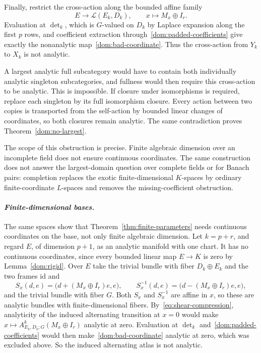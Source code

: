 \documentclass[11pt]{amsart}
\theoremstyle{definition}
\theoremstyle{remark}
\numberwithin{equation}{section}
\newcommand{\cL}{\mathcal L}
\newcommand{\id}{\mathrm{id}}
\begin{document}
Finally, restrict the cross-action along the bounded affine family
\[
E\longrightarrow\cL(E_k,D_k),\qquad x\longmapsto M_x\oplus I_r.
\]
Evaluation at $\det_k$, which is $G$\nobreakdash-valued on $D_k$ by Laplace expansion along the first $p$ rows, and coefficient extraction through~\eqref{dom:padded-coefficients} give exactly
the nonanalytic map~\eqref{dom:bad-coordinate}. Thus the cross-action from $Y_k$ to $X_k$ is not analytic.

A largest analytic full subcategory would have to contain both individually analytic singleton
subcategories, and fullness would then require this cross-action to be analytic. This is impossible.
If closure under isomorphisms is required, replace each singleton by its full isomorphism closure.
Every action between two copies is transported from the self-action by bounded linear changes of
coordinates, so both closures remain analytic. The same contradiction proves Theorem~\ref{dom:no-largest}.


The scope of this obstruction is precise. Finite algebraic dimension over an incomplete field does
not ensure continuous coordinates. The same construction does not answer the largest-domain question
over complete fields or for Banach pairs: completion replaces the exotic finite-dimensional
$K$-spaces by ordinary finite-coordinate $L$-spaces and removes the missing-coefficient obstruction.

\paragraph{\textit{Finite-dimensional bases.}}
The same spaces show that Theorem~\ref{thm:finite-parameters} needs continuous coordinates on the base,
not only finite algebraic dimension. Let $k=p+r$, and regard $E$, of dimension $p+1$, as an analytic
manifold with one chart. It has no continuous coordinates, since every bounded linear map $E\to K$ is
zero by Lemma~\ref{dom:rigid}. Over $E$ take the trivial bundle with fiber $D_k\oplus E_k$ and the two
frames $\id$ and
\[
 S_x(d,e)=\bigl(d+(M_x\oplus I_r)e,e\bigr),\qquad S_x^{-1}(d,e)=\bigl(d-(M_x\oplus I_r)e,e\bigr),
\]
and the trivial bundle with fiber $G$. Both $S_x$ and $S_x^{-1}$ are affine in $x$, so these are analytic bundles with
finite-dimensional fibers. By~\eqref{eq:shear-compression}, analyticity of the induced alternating
transition at $x=0$ would make $x\mapsto A^k_{E_k,D_k;G}(M_x\oplus I_r)$ analytic at zero. Evaluation at
$\det_k$ and~\eqref{dom:padded-coefficients} would then make~\eqref{dom:bad-coordinate} analytic at zero,
which was excluded above. So the induced alternating atlas is not analytic.
\end{document}
